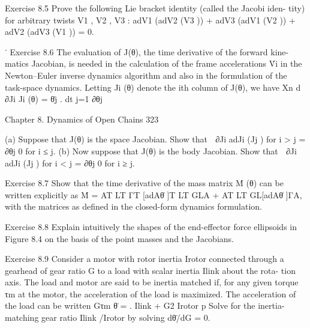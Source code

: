 \documentclass[12pt,a4paper]{article}
\begin{document}
Exercise 8.5 Prove the following Lie bracket identity (called the Jacobi iden-
tity) for arbitrary twists V1 , V2 , V3 :
               adV1 (adV2 (V3 )) + adV3 (adV1 (V2 )) + adV2 (adV3 (V1 )) = 0.

                                  ˙
Exercise 8.6 The evaluation of J(θ),    the time derivative of the forward kine-
matics Jacobian, is needed in the calculation of the frame accelerations V̇i in
the Newton–Euler inverse dynamics algorithm and also in the formulation of
the task-space dynamics. Letting Ji (θ) denote the ith column of J(θ), we have
                                                           Xn
                                               d               ∂Ji
                                                  Ji (θ) =         θ̇j .
                                               dt          j=1
                                                               ∂θj


Chapter 8. Dynamics of Open Chains                                                                  323

  (a) Suppose that J(θ) is the space Jacobian. Show that
                                  
                           ∂Ji      adJi (Jj ) for i > j
                               =
                           ∂θj              0 for i ≤ j.
  (b) Now suppose that J(θ) is the body Jacobian. Show that
                                 
                         ∂Ji        adJi (Jj ) for i < j
                              =
                         ∂θj                0 for i ≥ j.

Exercise 8.7 Show that the time derivative of the mass matrix Ṁ (θ) can be
written explicitly as
                 Ṁ = AT LT ΓT [adAθ̇ ]T LT GLA + AT LT GL[adAθ̇ ]ΓA,
with the matrices as defined in the closed-form dynamics formulation.

Exercise 8.8 Explain intuitively the shapes of the end-effector force ellipsoids
in Figure 8.4 on the basis of the point masses and the Jacobians.

Exercise 8.9 Consider a motor with rotor inertia Irotor connected through
a gearhead of gear ratio G to a load with scalar inertia Ilink about the rota-
tion axis. The load and motor are said to be inertia matched if, for any
given torque τm at the motor, the acceleration of the load is maximized. The
acceleration of the load can be written
                                         Gτm
                              θ̈ =                   .
                                   Ilink + G2 Irotor
                                           p
Solve for the inertia-matching gear ratio Ilink /Irotor by solving dθ̈/dG = 0.
\end{document}
